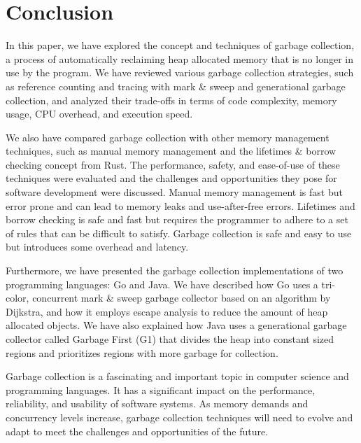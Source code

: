 \chapter{Conclusion}

In this paper, we have explored the concept and techniques of garbage collection,
a process of automatically reclaiming heap allocated memory that is no longer in
use by the program. We have reviewed various garbage collection strategies, such
as reference counting and tracing with mark \& sweep and generational garbage collection,
and analyzed their trade-offs in terms of code complexity, memory usage, CPU overhead,
and execution speed.

We also have compared garbage collection with other memory management techniques,
such as manual memory management and the lifetimes \& borrow checking concept from Rust.
The performance, safety, and ease-of-use of these techniques were evaluated and the
challenges and opportunities they pose for software development were discussed.
Manual memory management is fast but error prone and can lead to memory leaks and
use-after-free errors. Lifetimes and borrow checking is safe and fast but requires
the programmer to adhere to a set of rules that can be difficult to satisfy.
Garbage collection is safe and easy to use but introduces some overhead and latency.

Furthermore, we have presented the garbage collection implementations of two 
programming languages: Go and Java. We have described how Go uses a tri-color,
concurrent mark \& sweep garbage collector based on an algorithm by Dijkstra,
and how it employs escape analysis to reduce the amount of heap allocated objects.
We have also explained how Java uses a generational garbage collector called 
Garbage First (G1) that divides the heap into constant sized regions and prioritizes
regions with more garbage for collection.

Garbage collection is a fascinating and important topic in computer science and
programming languages. It has a significant impact on the performance, reliability, 
and usability of software systems. As memory demands and concurrency levels increase, 
garbage collection techniques will need to evolve and adapt to meet the challenges 
and opportunities of the future.

